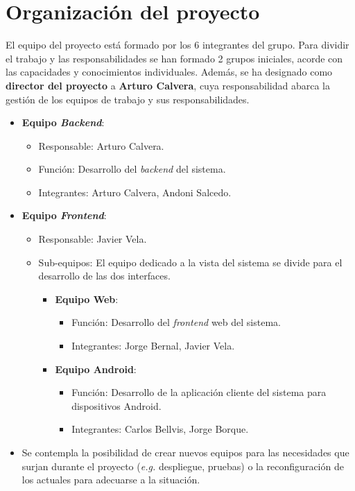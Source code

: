 \documentclass{article}
\begin{document}
\section{Organización del proyecto}

El equipo del proyecto está formado por los 6 integrantes del grupo. Para dividir el trabajo y las responsabilidades se han formado 2 grupos iniciales, acorde con las capacidades y conocimientos individuales. Además, se ha designado como \textbf{director del proyecto} a \textbf{Arturo Calvera}, cuya responsabilidad abarca la gestión de los equipos de trabajo y sus responsabilidades. 

\begin{itemize}
    \item \textbf{Equipo \textit{Backend}}:
    \begin{itemize}
        \item Responsable: Arturo Calvera.
        \item Función: Desarrollo del \textit{backend} del sistema.
        \item Integrantes: Arturo Calvera, Andoni Salcedo.
    \end{itemize}
    \item \textbf{Equipo \textit{Frontend}}:
    \begin{itemize}
        \item Responsable: Javier Vela.
        \item Sub-equipos: El equipo dedicado a la vista del sistema se divide para el desarrollo de las dos interfaces. 
        \begin{itemize}
            \item \textbf{Equipo Web}:
            \begin{itemize}
                \item Función: Desarrollo del \textit{frontend} web del sistema.
                \item Integrantes: Jorge Bernal, Javier Vela.
            \end{itemize}
        \item \textbf{Equipo Android}:
            \begin{itemize}
                \item Función: Desarrollo de la aplicación cliente del sistema para dispositivos Android.
                \item Integrantes: Carlos Bellvis, Jorge Borque.
            \end{itemize}
        \end{itemize}
    \end{itemize}
    \item Se contempla la posibilidad de crear nuevos equipos para las necesidades que surjan durante el proyecto (\textit{e.g.} despliegue, pruebas) o la reconfiguración de los actuales para adecuarse a la situación.
\end{itemize}
\end{document}
